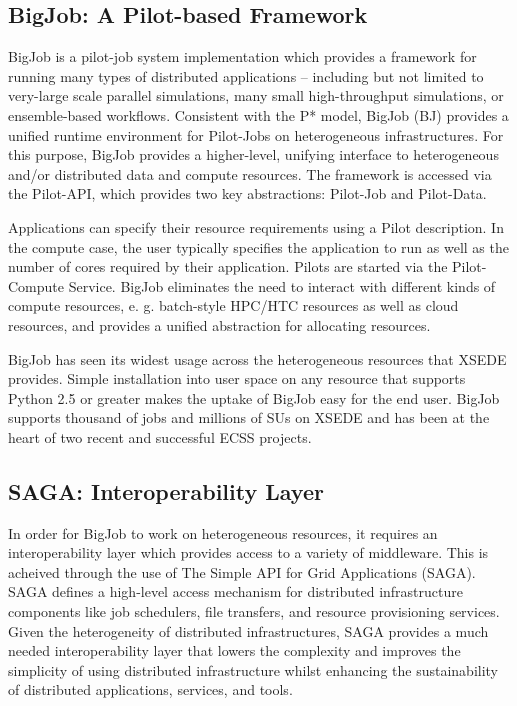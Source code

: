 \documentclass{sig-alternate}
\begin{document}
\subsection{BigJob: A Pilot-based Framework}

BigJob is a pilot-job system implementation which provides a framework
for running many types of distributed applications -- including but
not limited to very-large scale parallel simulations, many small
high-throughput simulations, or ensemble-based workflows. Consistent
with the P* model, BigJob (BJ) provides a unified runtime
environment for Pilot-Jobs on heterogeneous
infrastructures. For this purpose, BigJob provides a higher-level,
unifying interface to heterogeneous and/or distributed data and
compute resources. The framework is accessed via the Pilot-API, which
provides two key abstractions: Pilot-Job and Pilot-Data.

Applications can specify their resource requirements using a Pilot
description. In the compute case, the user typically specifies the
application to run as well as the number of cores required by their
application.  Pilots are started via the Pilot-Compute Service. BigJob 
eliminates the need to interact with different kinds of compute
resources, e. g. batch-style HPC/HTC resources as well as cloud
resources, and provides a unified abstraction for allocating
resources. 

BigJob has seen its widest usage across the heterogeneous resources
that XSEDE provides. Simple installation into user space on any
resource that supports Python 2.5 or greater makes the uptake of
BigJob easy for the end user. BigJob supports thousand of jobs and
millions of SUs on XSEDE and has been at the heart of two recent and
successful ECSS projects.


\subsection{SAGA: Interoperability Layer}

In order for BigJob to work on heterogeneous resources, it requires an
interoperability layer which provides access to a variety of
middleware.  This is acheived through the use of The Simple API for Grid Applications (SAGA).
SAGA defines a 
high-level access mechanism for distributed infrastructure components 
like job schedulers, file transfers, and resource provisioning services. 
Given the heterogeneity of distributed infrastructures, SAGA provides 
a much needed interoperability layer that lowers the complexity and 
improves the simplicity of using distributed infrastructure whilst 
enhancing the sustainability of distributed applications, services, and tools.
\end{document}
